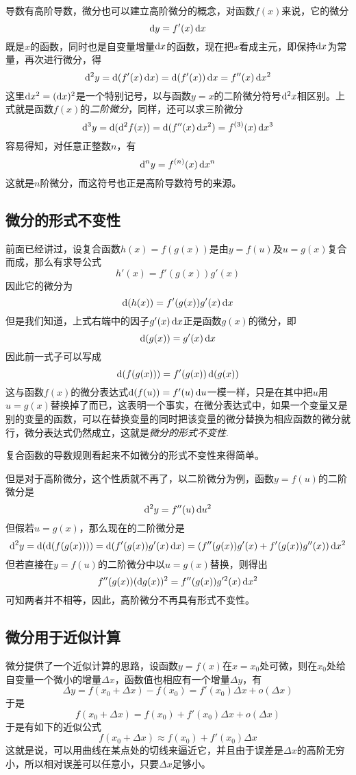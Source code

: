 导数有高阶导数，微分也可以建立高阶微分的概念，对函数$f(x)$来说，它的微分
\[ \mathop{}\!\mathrm{d} y = f'(x) \mathop{}\!\mathrm{d} x \]
既是$x$的函数，同时也是自变量增量$\mathop{}\!\mathrm{d} x$的函数，现在把$x$看成主元，即保持$\mathop{}\!\mathrm{d} x$为常量，再次进行微分，得
\[ \mathop{}\!\mathrm{d}^2 y = \mathop{}\!\mathrm{d} (f'(x) \mathop{}\!\mathrm{d} x) = \mathop{}\!\mathrm{d} (f'(x)) \mathop{}\!\mathrm{d} x = f''(x) \mathop{}\!\mathrm{d} x^2 \]
这里$\mathop{}\!\mathrm{d} x^2 = (\mathop{}\!\mathrm{d} x)^2$是一个特别记号，以与函数$y=x$的二阶微分符号$\mathop{}\!\mathrm{d}^2 x$相区别。上式就是函数$f(x)$的\emph{二阶微分}，同样，还可以求三阶微分
\[ \mathop{}\!\mathrm{d}^3 y = \mathop{}\!\mathrm{d} (\mathop{}\!\mathrm{d}^2 f(x)) = \mathop{}\!\mathrm{d} (f''(x) \mathop{}\!\mathrm{d} x^2) = f^{(3)}(x) \mathop{}\!\mathrm{d} x^3 \]
容易得知，对任意正整数$n$，有
\[ \mathop{}\!\mathrm{d}^n y = f^{(n)}(x) \mathop{}\!\mathrm{d} x^n \]
这就是$n$阶微分，而这符号也正是高阶导数符号的来源。

\subsection{微分的形式不变性}
\label{sec:the-non-variabriant-format-of-differtial}

前面已经讲过，设复合函数$h(x)=f(g(x))$是由$y=f(u)$及$u=g(x)$复合而成，那么有求导公式
\[ h'(x) = f'(g(x))g'(x) \]
因此它的微分为
\[ \mathop{}\!\mathrm{d} (h(x)) = f'(g(x)) g'(x) \mathop{}\!\mathrm{d} x \]
但是我们知道，上式右端中的因子$g'(x) \mathop{}\!\mathrm{d} x$正是函数$g(x)$的微分，即
\[ \mathop{}\!\mathrm{d} (g(x)) = g'(x) \mathop{}\!\mathrm{d} x \]
因此前一式子可以写成
\[ \mathop{}\!\mathrm{d} (f(g(x))) = f'(g(x)) \mathop{}\!\mathrm{d} (g(x)) \]
这与函数$f(x)$的微分表达式$\mathop{}\!\mathrm{d} (f(u)) = f'(u) \mathop{}\!\mathrm{d} u$一模一样，只是在其中把$u$用$u=g(x)$替换掉了而已，这表明一个事实，在微分表达式中，如果一个变量又是别的变量的函数，可以在替换变量的同时把该变量的微分替换为相应函数的微分就行，微分表达式仍然成立，这就是\emph{微分的形式不变性}.

复合函数的导数规则看起来不如微分的形式不变性来得简单。

但是对于高阶微分，这个性质就不再了，以二阶微分为例，函数$y=f(u)$的二阶微分是
\[ \mathop{}\!\mathrm{d}^2 y = f''(u) \mathop{}\!\mathrm{d} u^2 \]
但假若$u=g(x)$，那么现在的二阶微分是
\[ \mathop{}\!\mathrm{d}^2 y = \mathop{}\!\mathrm{d} (\mathop{}\!\mathrm{d} (f(g(x)))) = \mathop{}\!\mathrm{d} (f'(g(x))g'(x)\mathop{}\!\mathrm{d} x) = (f''(g(x))g'(x)+f'(g(x))g''(x)) \mathop{}\!\mathrm{d} x^2 \]
但若直接在$y=f(u)$的二阶微分中以$u=g(x)$替换，则得出
\[ f''(g(x)) (\mathop{}\!\mathrm{d} g(x))^2 = f''(g(x)) g'^2(x) \mathop{}\!\mathrm{d} x^2 \]
可知两者并不相等，因此，高阶微分不再具有形式不变性。

\subsection{微分用于近似计算}
\label{sec:approx-by-differtial}

微分提供了一个近似计算的思路，设函数$y=f(x)$在$x=x_0$处可微，则在$x_0$处给自变量一个微小的增量$\Delta x$，函数值也相应有一个增量$\Delta y$，有
\[ \Delta y = f(x_0+\Delta x) - f(x_0) = f'(x_0) \Delta x + o(\Delta x) \]
于是
\[ f(x_0+\Delta x) = f(x_0) + f'(x_0) \Delta x + o(\Delta x) \]
于是有如下的近似公式
\[ f(x_0+\Delta x) \approx f(x_0) + f'(x_0) \Delta x \]
这就是说，可以用曲线在某点处的切线来逼近它，并且由于误差是$\Delta x$的高阶无穷小，所以相对误差可以任意小，只要$\Delta x$足够小。

